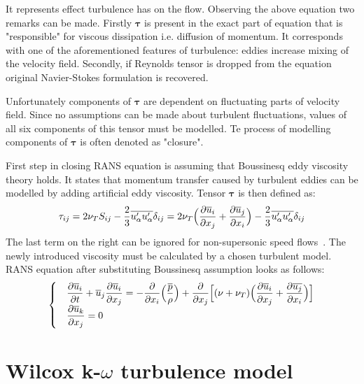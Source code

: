         It represents effect turbulence has on the flow. Observing the above equation two remarks can be made.
        Firstly $\bm{\tau}$ is present in the exact part of equation that is "responsible" for viscous dissipation i.e. diffusion of momentum.
        It corresponds with one of the aforementioned features of turbulence: eddies increase mixing of the velocity field.
        Secondly, if Reynolds tensor is dropped from the equation original Navier-Stokes formulation is recovered.

        Unfortunately components of $\bm{\tau}$ are dependent on fluctuating parts of velocity field.
        Since no assumptions can be made about turbulent fluctuations, values of all six components of this tensor must be modelled.
        Te process of modelling components of $\bm{\tau}$ is often denoted as "closure".

        First step in closing RANS equation is assuming that Boussinesq eddy viscosity theory holds.
        It states that momentum transfer caused by turbulent eddies can be modelled by adding artificial eddy viscosity.
        Tensor $\bm{\tau}$ is then defined as:
        \begin{equation}
            \tau_{ij} =  2\nu_T S_{ij} - \dfrac{2}{3}\overline{{u_\alpha' u_\alpha'}}\delta_{ij} = 2\nu_T \Big(\dfrac{\partial { \overline{{u}} _i}}{\partial {x_j}} + \dfrac{\partial { \overline{{u}} _j}}{\partial {x_i}} \Big) - \dfrac{2}{3}\overline{{u_\alpha' u_\alpha'}}\delta_{ij}
        \end{equation}
        The last term on the right can be ignored for non-supersonic speed flows~\cite{Wilcox}.
        The newly introduced viscosity must be calculated by a chosen turbulent model.
        RANS equation after substituting Boussinesq assumption looks as follows:
        \begin{equation}
            \begin{cases}
            &\pderiv{\rans{u}_i}{t} + \rans{u}_j \pderiv{\rans{u}_i}{x_j} = -\pderiv{}{x_i}\Big(\dfrac{\rans{p}}{\rho}\Big) %
            + \pderiv{}{x_j}\Big[ (\nu + \nu_T)\Big( \pderiv{\rans{u}_i}{x_j} + \pderiv{\rans{{u}_j}}{{x_i}} \Big) \Big]\\
            &\pderiv{\rans{u}_k}{x_j} = 0
            \end{cases}
        \end{equation}

    \section{Wilcox k-$\omega$ turbulence model}
        
